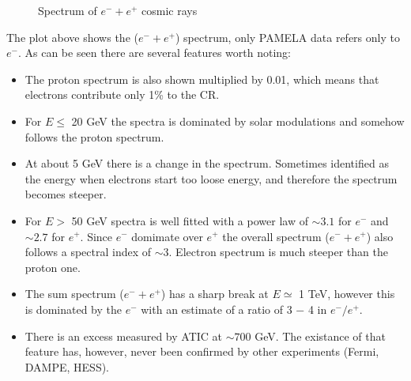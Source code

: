 \documentclass[
  letterpaper,
  DIV=11,
  numbers=noendperiod]{scrreprt}
\providecommand{\tightlist}{%
  \setlength{\itemsep}{0pt}\setlength{\parskip}{0pt}}\usepackage{longtable,booktabs,array}
\begin{document}
\begin{figure}[H]


\caption{\label{fig-cr-electrons}Spectrum of \(e^-+e^+\) cosmic rays}

\end{figure}%

The plot above shows the (\(e^− + e^+\)) spectrum, only PAMELA data
refers only to \(e^−\). As can be seen there are several features worth
noting:

\begin{itemize}
\tightlist
\item
  The proton spectrum is also shown multiplied by 0.01, which means that
  electrons contribute only 1\% to the CR.
\item
  For \(E \leq\) 20 GeV the spectra is dominated by solar modulations
  and somehow follows the proton spectrum.
\item
  At about 5 GeV there is a change in the spectrum. Sometimes identified
  as the energy when electrons start too loose energy, and therefore the
  spectrum becomes steeper.
\item
  For \(E >\) 50 GeV spectra is well fitted with a power law of
  \(\sim 3.1\) for \(e^−\) and \(\sim 2.7\) for \(e^+\). Since \(e^−\)
  domimate over \(e^+\) the overall spectrum (\(e^− + e^+\)) also
  follows a spectral index of \(\sim 3\). Electron spectrum is much
  steeper than the proton one.
\item
  The sum spectrum (\(e^− + e^+\)) has a sharp break at \(E \simeq\) 1
  TeV, however this is dominated by the \(e^−\) with an estimate of a
  ratio of 3 − 4 in \(e^−/e^+\).
\item
  There is an excess measured by ATIC at \(\sim 700\) GeV. The existance
  of that feature has, however, never been confirmed by other
  experiments (Fermi, DAMPE, HESS).
\end{itemize}
\end{document}
